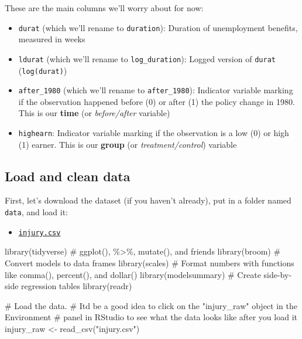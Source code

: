 \documentclass[
  letterpaper,
  DIV=11,
  numbers=noendperiod]{scrartcl}
\newenvironment{Shaded}{\begin{snugshade}}{\end{snugshade}}
\newcommand{\CommentTok}[1]{\textcolor[rgb]{0.37,0.37,0.37}{#1}}
\newcommand{\FunctionTok}[1]{\textcolor[rgb]{0.28,0.35,0.67}{#1}}
\newcommand{\NormalTok}[1]{\textcolor[rgb]{0.00,0.23,0.31}{#1}}
\newcommand{\OtherTok}[1]{\textcolor[rgb]{0.00,0.23,0.31}{#1}}
\newcommand{\StringTok}[1]{\textcolor[rgb]{0.13,0.47,0.30}{#1}}
\providecommand{\tightlist}{%
  \setlength{\itemsep}{0pt}\setlength{\parskip}{0pt}}\usepackage{longtable,booktabs,array}
\begin{document}
These are the main columns we'll worry about for now:

\begin{itemize}
\tightlist
\item
  \texttt{durat} (which we'll rename to \texttt{duration}): Duration of
  unemployment benefits, measured in weeks
\item
  \texttt{ldurat} (which we'll rename to \texttt{log\_duration}): Logged
  version of \texttt{durat} (\texttt{log(durat)})
\item
  \texttt{after\_1980} (which we'll rename to \texttt{after\_1980}):
  Indicator variable marking if the observation happened before (0) or
  after (1) the policy change in 1980. This is our \textbf{time} (or
  \emph{before/after} variable)
\item
  \texttt{highearn}: Indicator variable marking if the observation is a
  low (0) or high (1) earner. This is our \textbf{group} (or
  \emph{treatment/control}) variable
\end{itemize}

\hypertarget{load-and-clean-data}{%
\subsection{Load and clean data}\label{load-and-clean-data}}

First, let's download the dataset (if you haven't already), put in a
folder named \texttt{data}, and load it:

\begin{itemize}
\tightlist
\item
  \href{/files/data/package_data/injury.csv}{ \texttt{injury.csv}}
\end{itemize}

\begin{Shaded}
\begin{Highlighting}[]
\FunctionTok{library}\NormalTok{(tidyverse)  }\CommentTok{\# ggplot(), \%\textgreater{}\%, mutate(), and friends}
\FunctionTok{library}\NormalTok{(broom)  }\CommentTok{\# Convert models to data frames}
\FunctionTok{library}\NormalTok{(scales)  }\CommentTok{\# Format numbers with functions like comma(), percent(), and dollar()}
\FunctionTok{library}\NormalTok{(modelsummary)  }\CommentTok{\# Create side{-}by{-}side regression tables}
\FunctionTok{library}\NormalTok{(readr)}
\end{Highlighting}
\end{Shaded}

\begin{Shaded}
\begin{Highlighting}[]
\CommentTok{\# Load the data.}
\CommentTok{\# It\textquotesingle{}d be a good idea to click on the "injury\_raw" object in the Environment}
\CommentTok{\# panel in RStudio to see what the data looks like after you load it}
\NormalTok{injury\_raw }\OtherTok{\textless{}{-}} \FunctionTok{read\_csv}\NormalTok{(}\StringTok{"injury.csv"}\NormalTok{)}
\end{Highlighting}
\end{Shaded}
\end{document}
